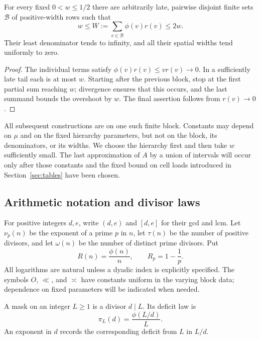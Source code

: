 \begin{lemma}\label{pre:blocks}
For every fixed $0<w\le1/2$ there are arbitrarily late, pairwise disjoint
finite sets $\mathcal B$ of positive-width rows such that
\begin{equation}\label{eq:block-mass}
 w\le W:=\sum_{v\in\mathcal B}\phi(v)r(v)\le2w.
\end{equation}
Their least denominator tends to infinity, and all their spatial widths
tend uniformly to zero.
\end{lemma}
\begin{proof}
The individual terms satisfy $\phi(v)r(v)\le v r(v)\to0$.
In a sufficiently late tail each is at most $w$. Starting after the
previous block, stop at the first partial sum reaching $w$; divergence
ensures that this occurs, and the last summand bounds the overshoot by
$w$. The final assertion follows from $r(v)\to0$.
\end{proof}

All subsequent constructions are on one such finite block. Constants may
depend on $\mu$ and on the fixed hierarchy parameters, but not on the
block, its denominators, or its widths. We choose the hierarchy first and
then take $w$ sufficiently small. The last approximation of $A$ by a union
of intervals will occur only after those constants and the fixed bound on
cell loads introduced in Section~\ref{sec:tables} have been chosen.

\subsection{Arithmetic notation and divisor laws}

For positive integers $d,e$, write $(d,e)$ and $[d,e]$ for their gcd and
lcm. Let $\nu_p(n)$ be the exponent of a prime $p$ in $n$, let $\tau(n)$
be the number of positive divisors, and let $\omega(n)$ be the number of
distinct prime divisors. Put
\[
 R(n)=\frac{\phi(n)}n,\qquad R_p=1-\frac1p.
\]
All logarithms are natural unless a dyadic index is explicitly specified.
The symbols $O$, $\ll$, and $\asymp$ have constants uniform in the varying
block data; dependence on fixed parameters will be indicated when needed.

\begin{definition}\label{pre:deficit-law}
A mask on an integer $L\ge1$ is a divisor $d\mid L$. Its deficit law is
\begin{equation}\label{eq:deficit-law}
 \pi_L(d)=\frac{\phi(L/d)}L.
\end{equation}
An exponent in $d$ records the corresponding deficit from $L$ in $L/d$.
\end{definition}

